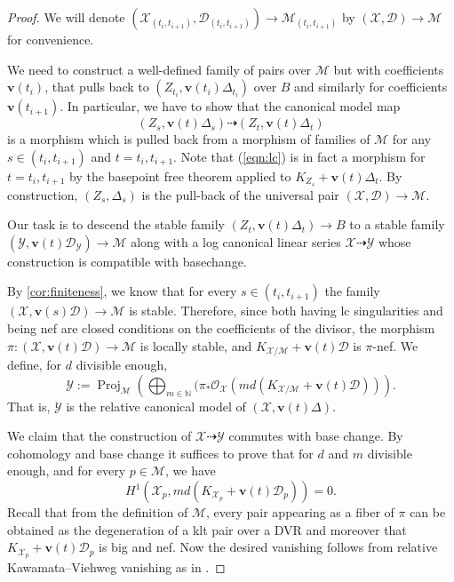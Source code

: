 \documentclass[11pt]{amsart}
\theoremstyle{definition}
\theoremstyle{remark}
\newcommand{\calO}{\mathcal O}
\newcommand{\calX}{\mathcal X}
\newcommand{\calY}{\mathcal Y}
\newcommand{\calD}{\mathcal D}
\newcommand{\sM}{\mathscr{M}}
\newcommand{\Proj}{\operatorname{Proj}}
\newcommand{\bfv}{\mathbf{v}}
\begin{document}
	\begin{proof} We will denote $(\calX_{(t_i, t_{i+1})}, \calD_{(t_i, t_{i + 1})}) \to \sM_{(t_i, t_{i+1})}$ by $(\calX, \calD) \to \sM$ for convenience. 
		
		We need to construct a well-defined family  of pairs over $\sM$ but with coefficients $\mathbf{v}(t_i)$, that pulls back to $(Z_{t_i}, \mathbf{v}(t_i) \Delta_{t_i}) $ over $B$ and similarly for coefficients $\bfv(t_{i + 1})$.
		In particular, we have to show that the canonical model map 
		\begin{equation}\label{eqn:lc}
			(Z_s, \bfv(t)\Delta_s) \dashrightarrow (Z_t, \bfv(t)\Delta_t)
		\end{equation}
		is a morphism which is pulled back from a morphism of families of $\sM$ for any $s \in (t_i, t_{i + 1})$ and $t = t_i, t_{i + 1}$. Note that (\ref{eqn:lc}) is in fact a morphism for $t = t_i, t_{i + 1}$ by the basepoint free theorem applied to $K_{Z_s} + \bfv(t)\Delta_t$. By construction, $(Z_s, \Delta_s)$ is the pull-back of the universal pair $(\calX, \calD) \to \sM$. 
		
		Our task is to descend the stable family $(Z_t, \bfv(t)\Delta_t) \to B$ to a stable family $(\calY, \bfv(t)\calD_\calY) \to \sM$ along with a log canonical linear series $\calX \dashrightarrow \calY$ whose construction is compatible with basechange.  
		
		By \ref{cor:finiteness}, we know that for every $s \in (t_i, t_{i + 1})$ the family $(\calX,\mathbf{v}(s)\calD) \to \sM$ is stable.
		Therefore, since both having lc singularities and being nef are  closed conditions on the coefficients of the divisor, the morphism $\pi:(\calX,\mathbf{v}(t)\calD) \to \sM$ is locally stable, and  $K_{\calX/\sM}+\mathbf{v}(t)\calD$ is $\pi$-nef. We define, for $d$ divisible enough, 
		$$
		\calY:=\Proj_\sM\left(\bigoplus_{m \in \mathbb{N}}(\pi_*\calO_{\calX}(md(K_{\calX/\sM}+\mathbf{v}(t)\calD))\right).
		$$
		That is, $\calY$ is the relative canonical model of $(\calX, \bfv(t)\Delta)$. 
		
		We claim that the construction of $\calX \dashrightarrow \calY$ commutes with base change. By cohomology and base change it suffices to prove that for $d$ and $m$ divisible enough, and for every $p \in \sM$, we have
		$$H^1\left(\calX_p,md\left(K_{\calX_p}+\mathbf{v}(t)\calD_p\right)\right)=0.$$
		Recall that from the definition of $\sM$, every pair appearing as a fiber of $\pi$ can be obtained as the degeneration of a klt pair over a DVR and moreover that $K_{\calX_p} + \bfv(t)\calD_p$ is big and nef. Now the desired vanishing follows from relative Kawamata--Viehweg vanishing as in \cite[Theorem 8.1]{Inc18}. 
		

\end{proof}
\end{document}
